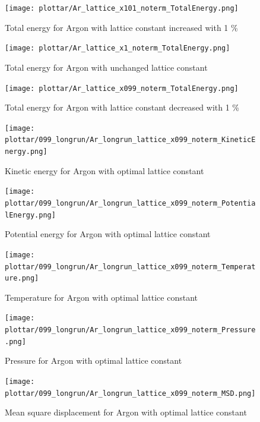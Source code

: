 \documentclass[12pt,a4paper]{article}
\begin{document}
\begin{center}

\begin{figure}
	\texttt{[image: plottar/Ar\_lattice\_x101\_noterm\_TotalEnergy.png]}
	\caption{Total energy for Argon with lattice constant increased with 1 \%}
	\label{fig:changeLattice101}
\end{figure}

\newpage
\begin{figure}
	\texttt{[image: plottar/Ar\_lattice\_x1\_noterm\_TotalEnergy.png]}
	\caption{Total energy for Argon with unchanged lattice constant}
	\label{fig:changeLattice100}
\end{figure}

\newpage
\begin{figure}
	\texttt{[image: plottar/Ar\_lattice\_x099\_noterm\_TotalEnergy.png]}
	\caption{Total energy for Argon with lattice constant decreased with 1 \%}
	\label{fig:changeLattice099}
\end{figure}

\newpage
\begin{figure}
	\texttt{[image: plottar/099\_longrun/Ar\_longrun\_lattice\_x099\_noterm\_KineticEnergy.png]}
	\caption{Kinetic energy for Argon with optimal lattice constant}
	\label{fig:Ar_Ekin}
\end{figure}

\newpage
\begin{figure}
	\texttt{[image: plottar/099\_longrun/Ar\_longrun\_lattice\_x099\_noterm\_PotentialEnergy.png]}
	\caption{Potential energy for Argon with optimal lattice constant}
	\label{fig:Ar_Epot}
\end{figure}

\newpage
\begin{figure}
	\texttt{[image: plottar/099\_longrun/Ar\_longrun\_lattice\_x099\_noterm\_Temperature.png]}
	\caption{Temperature for Argon with optimal lattice constant}
	\label{fig:Ar_Temp}
\end{figure}

\newpage
\begin{figure}
	\texttt{[image: plottar/099\_longrun/Ar\_longrun\_lattice\_x099\_noterm\_Pressure.png]}
	\caption{Pressure for Argon with optimal lattice constant}
	\label{fig:Ar_Pressure}
\end{figure}

\newpage
\begin{figure}
	\texttt{[image: plottar/099\_longrun/Ar\_longrun\_lattice\_x099\_noterm\_MSD.png]}
	\caption{Mean square displacement for Argon with optimal lattice constant}
	\label{fig:Ar_MSD}
\end{figure}


\end{center}
\end{document}
